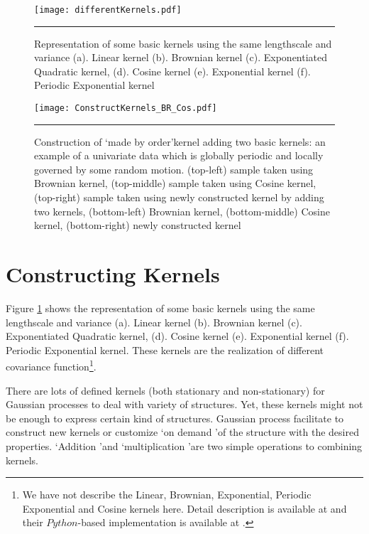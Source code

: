 \begin{figure}[t]
	\centering
		\texttt{[image: differentKernels.pdf]}
		\rule{35em}{0.5pt}
	\caption[Representation of some basic kernels ]
		{Representation of some basic kernels using the same lengthscale and variance (a). Linear kernel (b). Brownian kernel (c). Exponentiated Quadratic kernel, (d). Cosine kernel (e). Exponential kernel (f). Periodic Exponential kernel}
	\label{fig:DifferentKernels}
\end{figure}

\begin{figure}[t]
	\centering
		\texttt{[image: ConstructKernels\_BR\_Cos.pdf]}
		\rule{35em}{0.5pt}
	\caption[Construction of a new kernel adding two basic kernels]
		{Construction of \lq made by order\rq kernel adding two basic kernels: an example of a univariate data which is globally periodic and locally governed by some random motion. (top-left) sample taken using Brownian kernel, (top-middle) sample taken using Cosine kernel, (top-right) sample taken using newly constructed kernel by adding two kernels, (bottom-left) Brownian kernel, (bottom-middle) Cosine kernel, (bottom-right) newly constructed kernel} %
	\label{fig:ConstructKernels_BR_Cos}
\end{figure}

\section{Constructing Kernels}
Figure \ref{fig:DifferentKernels} shows the representation of some basic kernels using the same lengthscale and variance (a). Linear kernel (b). Brownian kernel (c). Exponentiated Quadratic kernel, (d). Cosine kernel (e). Exponential kernel (f). Periodic Exponential kernel. These kernels are the realization of different covariance function\footnote{We have not describe the Linear, Brownian, Exponential, Periodic Exponential and Cosine kernels here. Detail description is available at \cite{Rasmussen_and_Williams:2006} and their $Python$-based implementation is available at \cite{gpy2014}.}.

There are lots of defined kernels (both stationary and non-stationary) for Gaussian processes to deal with variety of structures. Yet, these kernels might not be enough to express certain kind of structures. Gaussian process facilitate to construct new kernels or customize \lq on demand \rq of the structure with the desired properties. \lq Addition \rq and \lq multiplication \rq are two simple operations to combining kernels.

